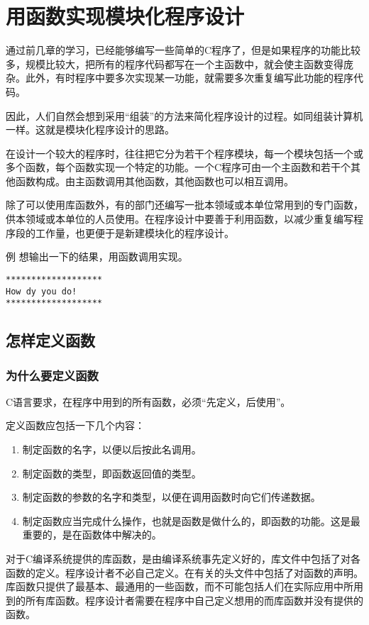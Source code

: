 \chapter{用函数实现模块化程序设计}
通过前几章的学习，已经能够编写一些简单的C程序了，但是如果程序的功能比较多，规模比较大，把所有的程序代码都写在一个主函数中，就会使主函数变得庞杂。此外，有时程序中要多次实现某一功能，就需要多次重复编写此功能的程序代码。

因此，人们自然会想到采用“组装”的方法来简化程序设计的过程。如同组装计算机一样。这就是模块化程序设计的思路。

在设计一个较大的程序时，往往把它分为若干个程序模块，每一个模块包括一个或多个函数，每个函数实现一个特定的功能。一个C程序可由一个主函数和若干个其他函数构成。由主函数调用其他函数，其他函数也可以相互调用。

除了可以使用库函数外，有的部门还编写一批本领域或本单位常用到的专门函数，供本领域或本单位的人员使用。在程序设计中要善于利用函数，以减少重复编写程序段的工作量，也更便于是新建模块化的程序设计。

例 想输出一下的结果，用函数调用实现。
\begin{lstlisting}
*******************
How dy you do!
*******************
\end{lstlisting}
\section{怎样定义函数}
\subsection{为什么要定义函数}
C语言要求，在程序中用到的所有函数，必须“先定义，后使用”。

定义函数应包括一下几个内容：
\begin{enumerate}
	\item 制定函数的名字，以便以后按此名调用。
	\item 制定函数的类型，即函数返回值的类型。
	\item 制定函数的参数的名字和类型，以便在调用函数时向它们传递数据。
	\item 制定函数应当完成什么操作，也就是函数是做什么的，即函数的功能。这是最重要的，是在函数体中解决的。
\end{enumerate}
对于C编译系统提供的库函数，是由编译系统事先定义好的，库文件中包括了对各函数的定义。程序设计者不必自己定义。在有关的头文件中包括了对函数的声明。库函数只提供了最基本、最通用的一些函数，而不可能包括人们在实际应用中所用到的所有库函数。程序设计者需要在程序中自己定义想用的而库函数并没有提供的函数。
